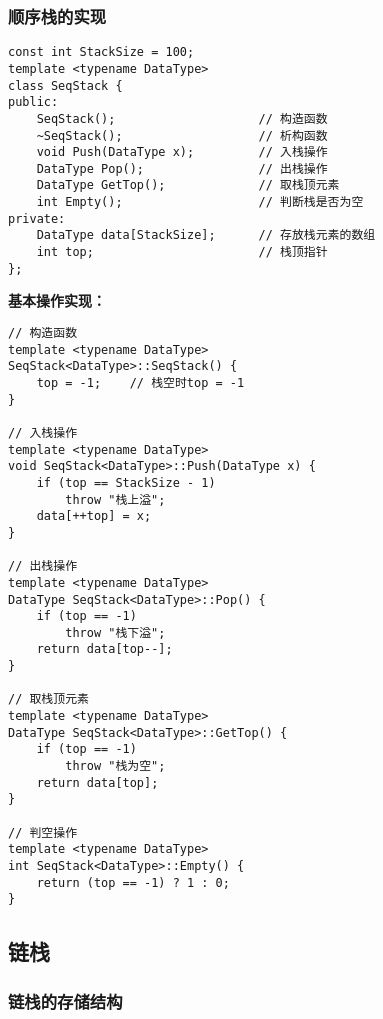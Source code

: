 \documentclass[12pt,a4paper]{amsart}
\begin{document}
\subsubsection{顺序栈的实现}

\indent

\begin{lstlisting}[caption=顺序栈类定义]
const int StackSize = 100;
template <typename DataType>
class SeqStack {
public:
    SeqStack();                    // 构造函数
    ~SeqStack();                   // 析构函数
    void Push(DataType x);         // 入栈操作
    DataType Pop();                // 出栈操作
    DataType GetTop();             // 取栈顶元素
    int Empty();                   // 判断栈是否为空
private:
    DataType data[StackSize];      // 存放栈元素的数组
    int top;                       // 栈顶指针
};
\end{lstlisting}

\textbf{基本操作实现：}

\begin{lstlisting}[caption=顺序栈基本操作]
// 构造函数
template <typename DataType>
SeqStack<DataType>::SeqStack() {
    top = -1;    // 栈空时top = -1
}

// 入栈操作
template <typename DataType>
void SeqStack<DataType>::Push(DataType x) {
    if (top == StackSize - 1) 
        throw "栈上溢";
    data[++top] = x;
}

// 出栈操作
template <typename DataType>
DataType SeqStack<DataType>::Pop() {
    if (top == -1) 
        throw "栈下溢";
    return data[top--];
}

// 取栈顶元素
template <typename DataType>
DataType SeqStack<DataType>::GetTop() {
    if (top == -1) 
        throw "栈为空";
    return data[top];
}

// 判空操作
template <typename DataType>
int SeqStack<DataType>::Empty() {
    return (top == -1) ? 1 : 0;
}
\end{lstlisting}

\subsection{链栈}

\subsubsection{链栈的存储结构}
\end{document}
